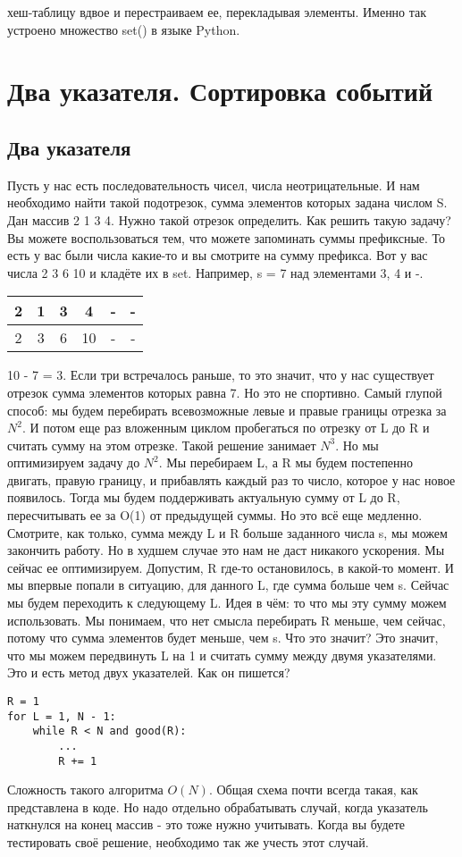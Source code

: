 \documentclass[a4paper,12pt]{article}
\begin{document}
хеш-таблицу вдвое и перестраиваем ее, перекладывая элементы. Именно так устроено множество set() в языке Python.
\newpage
\section{Два указателя. Сортировка событий}
\subsection{Два указателя}
Пусть у нас есть последовательность чисел, числа неотрицательные. И нам необходимо найти такой подотрезок, сумма элементов которых задана числом S. Дан массив 2 1 3 4. Нужно такой отрезок определить. Как решить такую задачу? Вы можете воспользоваться тем, что можете запоминать суммы префиксные. То есть у вас были числа какие-то и вы смотрите на сумму префикса. Вот у вас числа 2 3 6 10 и кладёте их в set. Например, s = 7 над элементами 3, 4 и -. 
\renewcommand{\arraystretch}{1.5}
\renewcommand{\tabcolsep}{0.2cm}
\begin{center}
\centering
\begin{tabular}{|c|c|c|c|c|c|}
\hline
2 & 1 & 3 & 4 & - & - \\
\hline
2 & 3 & 6 & 10 & - & - \\ 

\end{tabular}
\end{center}
10 - 7 = 3. Если три встречалось раньше, то это значит, что у нас существует отрезок сумма элементов которых равна 7. Но это не спортивно. Самый глупой способ: мы будем перебирать всевозможные левые и правые границы отрезка за $N^2$. И потом еще раз вложенным циклом пробегаться по отрезку от L до R и считать сумму на этом отрезке. Такой решение занимает $N^3$. Но мы оптимизируем задачу до $N^2$. Мы перебираем L, а R мы будем постепенно двигать, правую границу, и прибавлять каждый раз то число, которое у нас новое появилось. Тогда мы будем поддерживать актуальную сумму от L до R, пересчитывать ее за O(1) от предыдущей суммы. Но это всё еще медленно. Смотрите, как только, сумма между L и R больше заданного числа s, мы можем закончить работу. Но в худшем случае это нам не даст никакого ускорения. Мы сейчас ее оптимизируем. Допустим, R где-то остановилось, в какой-то момент. И мы впервые попали в ситуацию, для данного L, где сумма больше чем s. Сейчас мы будем переходить к следующему L. Идея в чём: то что мы эту сумму можем использовать. Мы понимаем, что нет смысла перебирать R меньше, чем сейчас, потому что сумма элементов будет меньше, чем s. Что это значит? Это значит, что мы можем передвинуть L на 1 и считать сумму между двумя указателями. Это и есть метод двух указателей. Как он пишется?
\begin{verbatim}
R = 1
for L = 1, N - 1:
    while R < N and good(R):
        ...
        R += 1
\end{verbatim}
Сложность такого алгоритма $O(N)$. Общая схема почти всегда такая, как представлена в коде. Но надо отдельно обрабатывать случай, когда указатель наткнулся на конец массив - это тоже нужно учитывать. Когда вы будете тестировать своё решение, необходимо так же учесть этот случай. 
\end{document}
